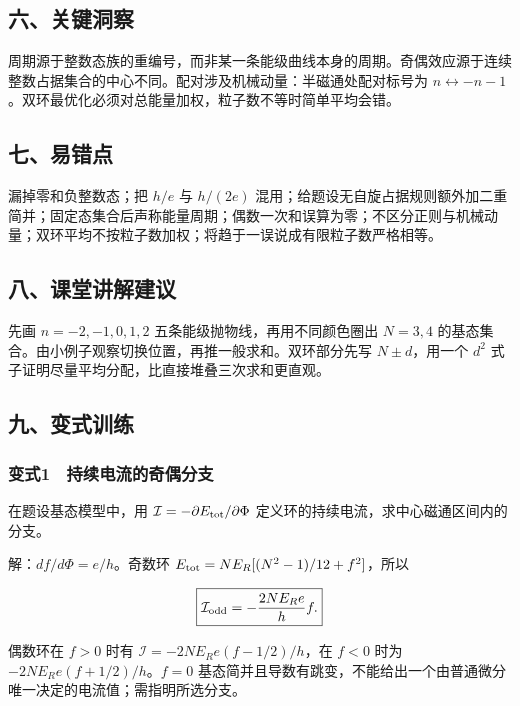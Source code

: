 \documentclass[12pt,a4paper,fontset=fandol]{ctexart}
\begin{document}
\subsection{六、关键洞察}\label{ux516dux5173ux952eux6d1eux5bdf-6}

周期源于整数态族的重编号，而非某一条能级曲线本身的周期。奇偶效应源于连续整数占据集合的中心不同。配对涉及机械动量：半磁通处配对标号为
\(n\leftrightarrow-n-1\)。双环最优化必须对总能量加权，粒子数不等时简单平均会错。

\subsection{七、易错点}\label{ux4e03ux6613ux9519ux70b9-6}

漏掉零和负整数态；把 \(h/e\) 与 \(h/(2e)\)
混用；给题设无自旋占据规则额外加二重简并；固定态集合后声称能量周期；偶数一次和误算为零；不区分正则与机械动量；双环平均不按粒子数加权；将趋于一误说成有限粒子数严格相等。

\subsection{八、课堂讲解建议}\label{ux516bux8bfeux5802ux8bb2ux89e3ux5efaux8bae-6}

先画 \(n=-2,-1,0,1,2\) 五条能级抛物线，再用不同颜色圈出 \(N=3,4\)
的基态集合。由小例子观察切换位置，再推一般求和。双环部分先写
\(N\pm d\)，用一个 \(d^2\)
式子证明尽量平均分配，比直接堆叠三次求和更直观。

\subsection{九、变式训练}\label{ux4e5dux53d8ux5f0fux8badux7ec3-6}

\subsubsection{变式1　持续电流的奇偶分支}\label{ux53d8ux5f0f1-ux6301ux7eedux7535ux6d41ux7684ux5947ux5076ux5206ux652f}

在题设基态模型中，用 \(\mathcal I=-\partial E_{\rm tot}/\partial\Phi\)
定义环的持续电流，求中心磁通区间内的分支。

解：\(df/d\Phi=e/h\)。奇数环 \(E_{\rm tot}=NE_R[(N^2-1)/12+f^2]\)，所以

\[\boxed{\mathcal I_{\rm odd}=-\frac{2NE_Re}{h}f.}\]

偶数环在 \(f>0\) 时有 \(\mathcal I=-2NE_Re(f-1/2)/h\)，在 \(f<0\) 时为
\(-2NE_Re(f+1/2)/h\)。\(f=0\)
基态简并且导数有跳变，不能给出一个由普通微分唯一决定的电流值；需指明所选分支。
\end{document}
